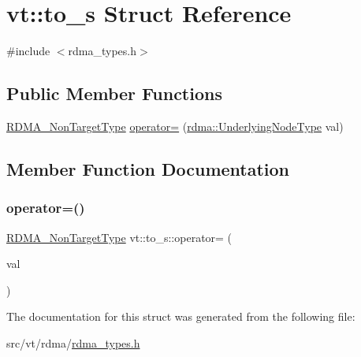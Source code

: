 \hypertarget{structvt_1_1to__s}{}\section{vt\+:\+:to\+\_\+s Struct Reference}
\label{structvt_1_1to__s}


{\ttfamily \#include $<$rdma\+\_\+types.\+h$>$}

\subsection*{Public Member Functions}
\begin{DoxyCompactItemize}
\item 
\hyperlink{namespacevt_ae5bd2866e5ee83f4d6a53e8730cd3202}{R\+D\+M\+A\+\_\+\+Non\+Target\+Type} \hyperlink{structvt_1_1to__s_a35a7058e7f8354c4e59e79acf4ec6a91}{operator=} (\hyperlink{namespacevt_1_1rdma_a20d01bc82b95453c162d4b9857a4a78a}{rdma\+::\+Underlying\+Node\+Type} val)
\end{DoxyCompactItemize}


\subsection{Member Function Documentation}
\mbox{\label{structvt_1_1to__s_a35a7058e7f8354c4e59e79acf4ec6a91}} 
\subsubsection{\texorpdfstring{operator=()}{operator=()}}
{\footnotesize\ttfamily \hyperlink{namespacevt_ae5bd2866e5ee83f4d6a53e8730cd3202}{R\+D\+M\+A\+\_\+\+Non\+Target\+Type} vt\+::to\+\_\+s\+::operator= (\begin{DoxyParamCaption}\item[{\hyperlink{namespacevt_1_1rdma_a20d01bc82b95453c162d4b9857a4a78a}{rdma\+::\+Underlying\+Node\+Type}}]{val }\end{DoxyParamCaption})\hspace{0.3cm}{\ttfamily [inline]}}



The documentation for this struct was generated from the following file\+:\begin{DoxyCompactItemize}
\item 
src/vt/rdma/\hyperlink{rdma__types_8h}{rdma\+\_\+types.\+h}\end{DoxyCompactItemize}
